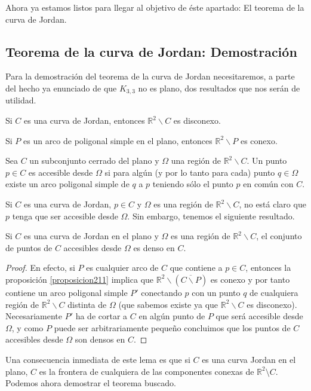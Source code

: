 \documentclass[12pt,a4paper,oldfontcommands]{memoir}
\begin{document}
Ahora ya estamos listos para llegar al objetivo de éste apartado: El teorema de la curva de Jordan.

\subsection{Teorema de la curva de Jordan: Demostración}

Para la demostración del teorema de la curva de Jordan necesitaremos, a parte del hecho ya enunciado de que $K_{3,3}$ no es plano, dos resultados que nos serán de utilidad.

\begin{lemma}\label{proposicion26}
	Si $C$ es una curva de Jordan, entonces $\mathbb{R}^{2} \backslash C$ es disconexo.
\end{lemma}
	
\begin{proposition}\label{proposicion211}
	Si $P$ es un arco de poligonal simple en el plano, entonces $\mathbb{R}^2 \backslash P$ es conexo.
\end{proposition}

\begin{definition}
	Sea $C$ un subconjunto cerrado del plano y $\Omega$ una región de $\mathbb{R}^2 \backslash C$. Un punto $p \in C$ es accesible desde $\Omega$ si para algún (y por lo tanto para cada) punto $q \in \Omega$ existe un arco poligonal simple de $q$ a $p$ teniendo sólo el punto $p$ en común con $C$.
\end{definition}

Si $C$ es una curva de Jordan, $p\in C$ y $\Omega$ es una región de  $\mathbb{R}^2 \backslash C$,  no está claro que $p$ tenga que ser accesible desde $\Omega$. Sin embargo, tenemos el siguiente resultado.

\begin{lemma}
Si $C$ es una curva de Jordan en el plano y $\Omega$ es una región de  $\mathbb{R}^2 \backslash C$, el conjunto de puntos de $C$  accesibles desde $\Omega$  es denso en $C$.
\end{lemma}
\begin{proof} En efecto, si $P$ es cualquier arco de $C$ que contiene a $p\in C$, entonces la proposición \ref{proposicion211} implica que $\mathbb{R}^2 \backslash (\overline{C \backslash P})$ es conexo y por tanto contiene un arco poligonal simple $P'$ conectando $p$ con un punto  $q$ de cualquiera región de $\mathbb{R}^2 \backslash C$ distinta de $\Omega$ (que sabemos existe ya que $\mathbb{R}^2 \backslash C$  es disconexo). Necesariamente  $P'$ ha de cortar a $C$ en algún punto de $P$ que será accesible desde $\Omega$, y como $P$ puede ser  arbitrariamente pequeño  concluimos que los puntos de $C$ accesibles desde $\Omega$ son densos en $C$. 
\end{proof}
Una consecuencia inmediata de este lema es que si $C$ es una curva Jordan  en el plano, $C$ es la frontera de cualquiera de las componentes conexas de $\mathbb{R}^2\setminus C$.
Podemos ahora demostrar el teorema buscado.
\end{document}
